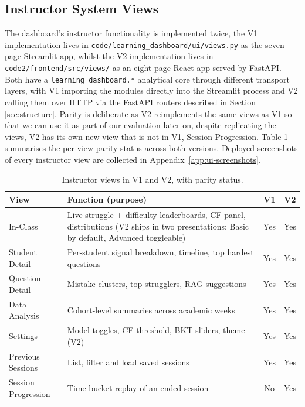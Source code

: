 \subsection{Instructor System Views} \label{sec:views}

The dashboard's instructor functionality is implemented twice, the V1 implementation lives in \texttt{code/learning\_dashboard/ui/views.py} as the seven page Streamlit app, whilst the V2 implementation lives in \texttt{code2/frontend/src/views/} as an eight page React app served by FastAPI. 
Both have a \texttt{learning\_dashboard.*} analytical core through different transport layers, with V1 importing the modules directly into the Streamlit process and V2 calling them over HTTP via the FastAPI routers described in Section \ref{sec:structure}. 
Parity is deliberate as V2 reimplements the same views as V1 so that we can use it as part of our evaluation later on, despite replicating the views, V2 has its own new view that is not in V1, Session Progression. Table \ref{tab:views-comparison} summarises the per-view parity status across both versions. Deployed screenshots of every instructor view are collected in Appendix~\ref{app:ui-screenshots}.

\begin{table}[H]
\centering
\caption{Instructor views in V1 and V2, with parity status.}
\label{tab:views-comparison}
\small
\begin{tabularx}{\textwidth}{|l|X|c|c|}
\hline
\textbf{View} & \textbf{Function (purpose)} & \textbf{V1} & \textbf{V2} \\
\hline\hline
In-Class            & Live struggle + difficulty leaderboards, CF panel, distributions (V2 ships in two presentations: Basic by default, Advanced toggleable) & Yes & Yes \\
\hline
Student Detail      & Per-student signal breakdown, timeline, top hardest questions             & Yes & Yes \\
\hline
Question Detail     & Mistake clusters, top strugglers, RAG suggestions                          & Yes & Yes \\
\hline
Data Analysis       & Cohort-level summaries across academic weeks                              & Yes & Yes \\
\hline
Settings            & Model toggles, CF threshold, BKT sliders, theme (V2)                       & Yes & Yes \\
\hline
Previous Sessions   & List, filter and load saved sessions                                       & Yes & Yes \\
\hline
Session Progression & Time-bucket replay of an ended session                                     & No  & Yes \\
\hline
\end{tabularx}
\end{table}

